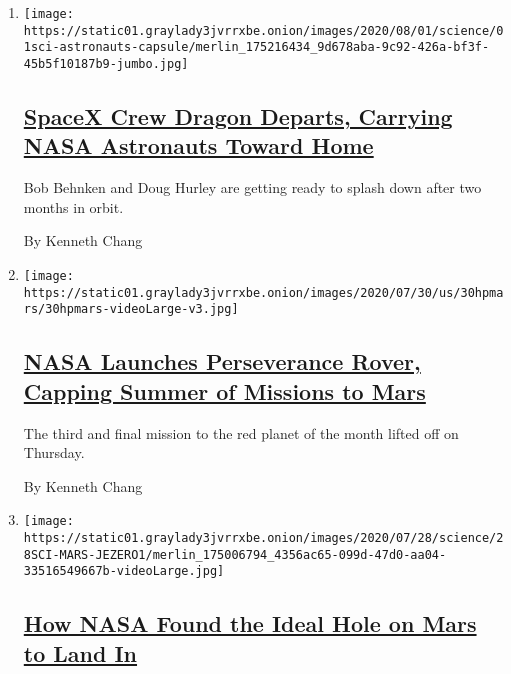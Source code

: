 \begin{enumerate}
\def\labelenumi{\arabic{enumi}.}
\item
  \texttt{[image: https://static01.graylady3jvrrxbe.onion/images/2020/08/01/science/01sci-astronauts-capsule/merlin\_175216434\_9d678aba-9c92-426a-bf3f-45b5f10187b9-jumbo.jpg]}

  \hypertarget{spacex-crew-dragon-departs-carrying-nasa-astronauts-toward-home}{%
  \subsection{\texorpdfstring{\href{/2020/08/01/science/nasa-spacex-astronauts.html}{SpaceX
  Crew Dragon Departs, Carrying NASA Astronauts Toward
  Home}}{SpaceX Crew Dragon Departs, Carrying NASA Astronauts Toward Home}}\label{spacex-crew-dragon-departs-carrying-nasa-astronauts-toward-home}}

  Bob Behnken and Doug Hurley are getting ready to splash down after two
  months in orbit.

  By Kenneth Chang
\item
  \texttt{[image: https://static01.graylady3jvrrxbe.onion/images/2020/07/30/us/30hpmars/30hpmars-videoLarge-v3.jpg]}

  \hypertarget{nasa-launches-perseverance-rover-capping-summer-of-missions-to-mars}{%
  \subsection{\texorpdfstring{\href{/2020/07/30/science/nasa-mars-launch.html}{NASA
  Launches Perseverance Rover, Capping Summer of Missions to
  Mars}}{NASA Launches Perseverance Rover, Capping Summer of Missions to Mars}}\label{nasa-launches-perseverance-rover-capping-summer-of-missions-to-mars}}

  The third and final mission to the red planet of the month lifted off
  on Thursday.

  By Kenneth Chang
\item
  \texttt{[image: https://static01.graylady3jvrrxbe.onion/images/2020/07/28/science/28SCI-MARS-JEZERO1/merlin\_175006794\_4356ac65-099d-47d0-aa04-33516549667b-videoLarge.jpg]}

  \hypertarget{how-nasa-found-the-ideal-hole-on-mars-to-land-in}{%
  \subsection{\texorpdfstring{\href{/2020/07/28/science/nasa-jezero-perseverance.html}{How
  NASA Found the Ideal Hole on Mars to Land
  In}}{How NASA Found the Ideal Hole on Mars to Land In}}\label{how-nasa-found-the-ideal-hole-on-mars-to-land-in}}


\end{enumerate}
